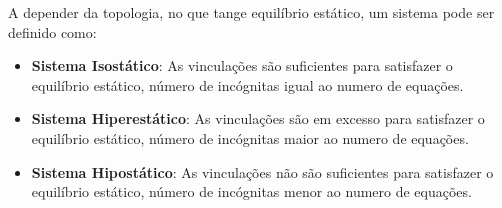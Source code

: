 \documentclass{article}
\begin{document}
            A depender da topologia, no que tange equilíbrio estático, um sistema pode ser definido como:
            \begin{itemize}
                \item \textbf{Sistema Isostático}: As vinculações são suficientes para satisfazer o equilíbrio estático, número de incógnitas igual ao numero de equações.
                \item \textbf{Sistema Hiperestático}: As vinculações são em excesso para satisfazer o equilíbrio estático, número de incógnitas maior ao numero de equações.
                \item \textbf{Sistema Hipostático}: As vinculações não são suficientes para satisfazer o equilíbrio estático, número de incógnitas menor ao numero de equações.
            \end{itemize}


    
\end{document}

